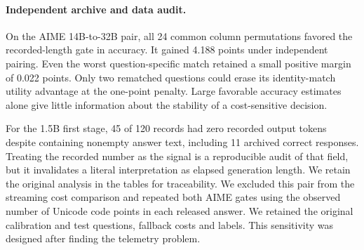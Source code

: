 \begin{table}[htbp]\centering\footnotesize
\caption{Streaming length gate versus pre-answer random bypass. All columns are per incoming request. The fallback point uses the product pairing. Ranges permit question-specific reindexing. The last two columns are weighted token differences in first-stage equivalents. Missing 1.5B telemetry precludes this comparison.}\label{tab:cost}

\end{table}

\paragraph{Independent archive and data audit.}
On the AIME 14B-to-32B pair, all 24 common column permutations favored the recorded-length gate in accuracy. It gained 4.188 points under independent pairing. Even the worst question-specific match retained a small positive margin of 0.022 points. Only two rematched questions could erase its identity-match utility advantage at the one-point penalty. Large favorable accuracy estimates alone give little information about the stability of a cost-sensitive decision.

For the 1.5B first stage, 45 of 120 records had zero recorded output tokens despite containing nonempty answer text, including 11 archived correct responses. Treating the recorded number as the signal is a reproducible audit of that field, but it invalidates a literal interpretation as elapsed generation length. We retain the original analysis in the tables for traceability. We excluded this pair from the streaming cost comparison and repeated both AIME gates using the observed number of Unicode code points in each released answer. We retained the original calibration and test questions, fallback costs and labels. This sensitivity was designed after finding the telemetry problem.


\begin{table}[htbp]\centering\footnotesize
\caption{Product accuracy comparisons in points. Keep, Median and Always are alternative fallback rules. Within and Between decompose the primary contrast. The last column repeats that contrast using all questions with the same previously fitted cutoff.}\label{tab:controls}

\end{table}
